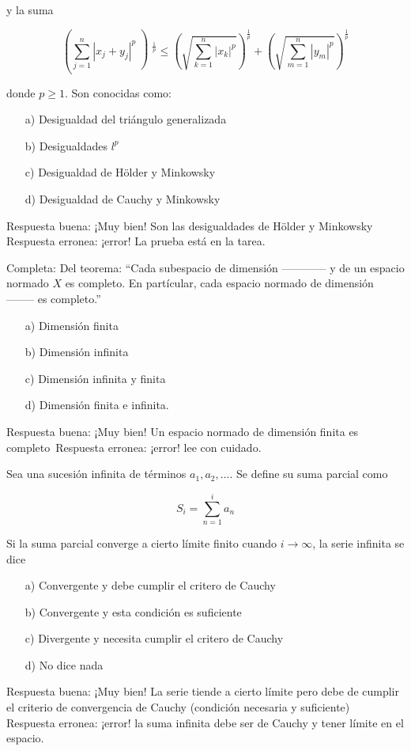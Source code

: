 \documentclass{exam}
\begin{document}
\begin{questions}
y la suma

\[ \left(\sum_{j=1}^{n} |x_j + y_ j|^p \left)^{\frac{1}{p}} \leq \left(\sqrt{\sum_{k=1}^{n}|x_k|^p}\right)^{\frac{1}{p}} + \left(\sqrt{\sum_{m=1}^{n}|y_m|^p}\right)^{\frac{1}{p}}\]

donde $p \geq 1$. Son conocidas como:
 
  
\begin{itemize}
\item[a)] Desigualdad del triángulo generalizada
\item[b)] Desigualdades $l^p$
\item[c)] Desigualdad de Hölder y Minkowsky
\item[d)] Desigualdad de Cauchy y Minkowsky
\end{itemize}

Respuesta buena: ¡Muy bien! Son las desigualdades de Hölder y Minkowsky\\
Respuesta erronea: ¡error! La prueba está en la tarea.

\question Completa: Del teorema: ``Cada subespacio de dimensión ------------ y de un espacio normado $X$ es completo. En partícular, cada espacio normado de dimensión -------- es completo.'' 

\begin{itemize}
\item[a)] Dimensión finita
\item[b)] Dimensión infinita
\item[c)] Dimensión infinita y finita
\item[d)] Dimensión finita e infinita.
\end{itemize}

Respuesta buena: ¡Muy bien! Un espacio normado de dimensión finita es completo\
Respuesta erronea: ¡error! lee con cuidado.


\question Sea una sucesión infinita de términos $a_1, a_2, ... $. Se define su suma parcial como

\[S_i = \sum _{n=1}^{i} a_n\]

Si la suma parcial converge a cierto límite finito cuando $i \to \infty$, la serie infinita se dice 

\begin{itemize}
\item[a)] Convergente y debe cumplir el critero de Cauchy
\item[b)] Convergente y esta condición es suficiente
\item[c)] Divergente y necesita cumplir el critero de Cauchy
\item[d)] No dice nada
\end{itemize}

Respuesta buena: ¡Muy bien! La serie tiende a cierto límite pero debe de cumplir el criterio de convergencia de Cauchy (condición necesaria y suficiente)\\
Respuesta erronea: ¡error! la suma infinita debe ser de Cauchy y tener límite en el espacio.
\end{questions}
\end{document}
